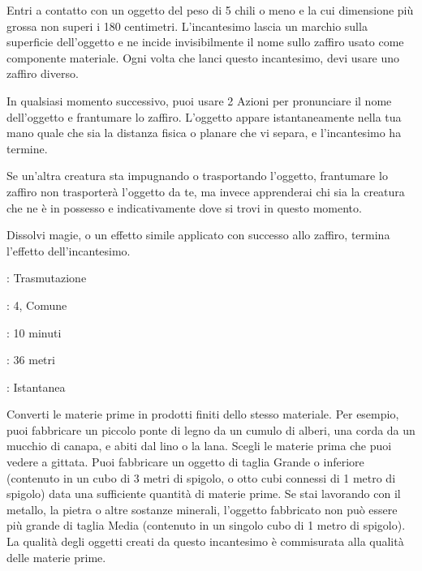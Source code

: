 \begin{multicols}{2}
Entri a contatto con un oggetto del peso di 5 chili o meno e la cui dimensione più grossa non superi i 180 centimetri. L'incantesimo lascia un marchio sulla superficie dell'oggetto e ne incide invisibilmente il nome sullo zaffiro usato come componente materiale. Ogni volta che lanci questo incantesimo, devi usare uno zaffiro diverso.

In qualsiasi momento successivo, puoi usare 2 Azioni per pronunciare il nome dell'oggetto e frantumare lo zaffiro. L'oggetto appare istantaneamente nella tua mano quale che sia la distanza fisica o planare che vi separa, e l'incantesimo ha termine.

Se un'altra creatura sta impugnando o trasportando l'oggetto, frantumare lo zaffiro non trasporterà l'oggetto da te, ma invece apprenderai chi sia la creatura che ne è in possesso e indicativamente dove si trovi in questo momento.

Dissolvi magie, o un effetto simile applicato con successo allo zaffiro, termina l'effetto dell'incantesimo.

\noindent\colorbox{OBSSgold!10}{
\begin{minipage}{0.95\linewidth}
\begin{description}[noitemsep, topsep=0pt, parsep=0pt, partopsep=0pt, leftmargin=0cm, labelwidth=1.3cm]
	\item[\textbf{Lista}]: Trasmutazione
	\item[\textbf{Livello}]: 4, Comune
	\item[\textbf{Lancio}]: 10 minuti
	\item[\textbf{Gittata}]: 36 metri
	\item[\textbf{Durata}]: Istantanea
\end{description}
\end{minipage}}\smallskip

Converti le materie prime in prodotti finiti dello stesso materiale. Per esempio, puoi fabbricare un piccolo ponte di legno da un cumulo di alberi, una corda da un mucchio di canapa, e abiti dal lino o la lana. Scegli le materie prima che puoi vedere a gittata. Puoi fabbricare un oggetto di taglia Grande o inferiore (contenuto in un cubo di 3 metri di spigolo, o otto cubi connessi di 1 metro di spigolo) data una sufficiente quantità di materie prime. Se stai lavorando con il metallo, la pietra o altre sostanze minerali, l'oggetto fabbricato non può essere più grande di taglia Media (contenuto in un singolo cubo di 1 metro di spigolo). La qualità degli oggetti creati da questo incantesimo è commisurata alla qualità delle materie prime.


\end{multicols}
